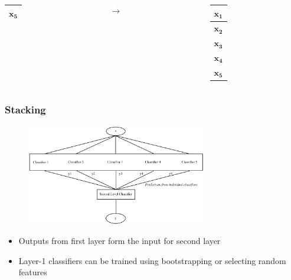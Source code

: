 \documentclass{beamer}
\begin{document}
\begin{frame}
\begin{columns}
\begin{column}{0.3\textwidth}
\begin{center}
\begin{tabular}{| c |}
                        \hline
                        $\mathbf{x_5}$\\
                        \hline
                    \end{tabular}
                \end{center}
            \end{column}
            \begin{column}{0.05\textwidth}
                $\rightarrow$
            \end{column}
            \begin{column}{0.3\textwidth}
                \begin{center}
                    \begin{tabular}{| c |}
                        \hline
                        $\mathbf{x_1}$\\
                        \hline
                        $\mathbf{x_2}$\\
                        \hline
                        $\mathbf{x_3}$\\
                        \hline
                        $\mathbf{x_4}$\\
                        \hline
                        $\mathbf{x_5}$\\
                        \hline
                    \end{tabular}
                \end{center}
            \end{column}
        \end{columns}
    \end{frame}
    
    \begin{frame}
        \frametitle{Stacking}
        \begin{figure}
            \centering
            \includegraphics[width=0.7\textwidth]{figures/stacking_prediction_flow.png}
        \end{figure}
        \begin{itemize}
            \item{Outputs from first layer form the input for second layer}
            \item{Layer-1 classifiers can be trained using bootstrapping or selecting random features}
        \end{itemize}
    \end{frame}
    
\end{document}
